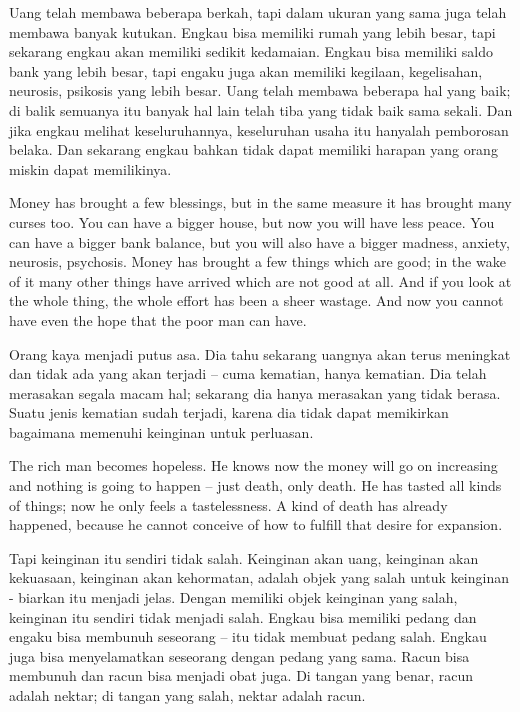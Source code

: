 \bahasa
Uang telah membawa beberapa berkah, tapi dalam ukuran yang sama juga telah membawa banyak kutukan. Engkau bisa memiliki rumah yang lebih besar, tapi sekarang engkau akan memiliki sedikit kedamaian. Engkau bisa memiliki saldo bank yang lebih besar, tapi engaku juga akan memiliki kegilaan, kegelisahan, neurosis, psikosis yang lebih besar. Uang telah membawa beberapa hal yang baik; di balik semuanya itu banyak hal lain telah tiba yang tidak baik sama sekali. Dan jika engkau melihat keseluruhannya, keseluruhan usaha itu hanyalah pemborosan belaka. Dan sekarang engkau bahkan tidak dapat memiliki harapan yang orang miskin dapat memilikinya.

\english
Money has brought a few blessings, but in the same measure it has brought many curses too. You can have a bigger house, but now you will have less peace. You can have a bigger bank balance, but you will also have a bigger madness, anxiety, neurosis, psychosis. Money has brought a few things which are good; in the wake of it many other things have arrived which are not good at all. And if you look at the whole thing, the whole effort has been a sheer wastage. And now you cannot have even the hope that the poor man can have.

\bahasa
Orang kaya menjadi putus asa. Dia tahu sekarang uangnya akan terus meningkat dan tidak ada yang akan terjadi -- cuma kematian, hanya kematian. Dia telah merasakan segala macam hal; sekarang dia hanya merasakan yang tidak berasa. Suatu jenis kematian sudah terjadi, karena dia tidak dapat memikirkan bagaimana memenuhi keinginan untuk perluasan.

\english
The rich man becomes hopeless. He knows now the money will go on increasing and
nothing is going to happen -- just death, only death. He has tasted all kinds of things; now he only feels a tastelessness. A kind of death has already happened, because he cannot conceive of how to fulfill that desire for expansion.

\bahasa
Tapi keinginan itu sendiri tidak salah. Keinginan akan uang, keinginan akan kekuasaan, keinginan akan kehormatan, adalah objek yang salah untuk keinginan - biarkan itu menjadi jelas. Dengan memiliki objek keinginan yang salah, keinginan itu sendiri tidak menjadi salah. Engkau bisa memiliki pedang dan engaku bisa membunuh seseorang -- itu tidak membuat pedang salah. Engkau juga bisa menyelamatkan seseorang dengan pedang yang sama. Racun bisa membunuh dan racun bisa menjadi obat juga. Di tangan yang benar, racun adalah nektar; di tangan yang salah, nektar adalah racun.

